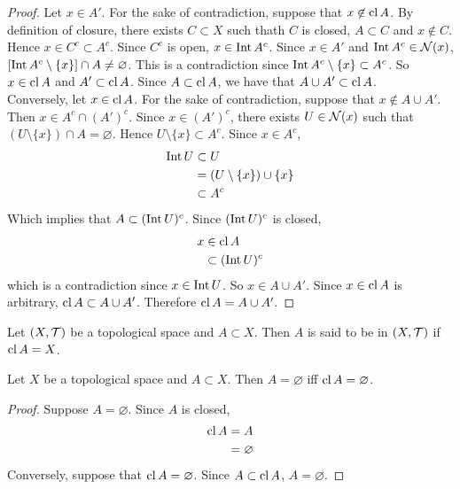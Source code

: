 \documentclass{book}
\begin{document}
	\begin{proof}
	Let $x \in A'$. For the sake of contradiction, suppose that $x \not \in \operatorname{cl} A$. By definition of closure, there exists $C \subset X$ such thath $C$ is closed, $A \subset C$ and $x \not \in C$. Hence $x \in C^c \subset A^c$. Since $C^c$ is open, $x \in \operatorname{Int} A^c$. Since $x \in A'$ and $\operatorname{Int} A^c \in \mathcal{N}(x)$, $[\operatorname{Int} A^c \setminus \{x\}] \cap A \neq \varnothing$. This is a contradiction since $\operatorname{Int} A^c \setminus \{x\} \subset A^c$. So $x \in \operatorname{cl} A$ and $A' \subset \operatorname{cl} A$. Since $A \subset \operatorname{cl} A$, we have that $A \cup A' \subset \operatorname{cl} A $.\\ 
	Conversely, let $x \in \operatorname{cl} A$. For the sake of contradiction, suppose that $x \not \in A \cup A'$. Then $x \in A^c \cap (A')^c$. Since $x \in (A')^c$, there exists $U \in \mathcal{N}(x)$ such that $(U \setminus \{x\}) \cap A = \varnothing$. Hence $U \setminus \{x\} \subset A^c$. Since $x \in A^c$, 
	\begin{align*}
	\operatorname{Int} U 
	& \subset U \\ 
	&= (U \setminus \{x\}) \cup \{x\} \\
	& \subset A^c
\end{align*}	
	Which implies that $A \subset (\operatorname{Int} U)^c$. Since $(\operatorname{Int} U)^c$ is closed, 
	\begin{align*}
		x 
		& \in \operatorname{cl} A \\
		& \subset (\operatorname{Int} U)^c 
	\end{align*}
	which is a contradiction since $x \in \operatorname{Int} U$. So $x \in A \cup A'$. Since $x \in \operatorname{cl} A$ is arbitrary, $\operatorname{cl} A \subset A \cup A'$. Therefore $\operatorname{cl} A = A \cup A'$.
	\end{proof}
	
	\begin{defn}  
		Let $(X, \mathcal{T})$ be a topological space and $A \subset X$. Then $A$ is said to be  in $(X, \mathcal{T})$ if $\operatorname{cl} A = X$. 
	\end{defn}

	\begin{ex}  
		Let $X$ be a topological space and $A \subset X$. Then $A = \varnothing$ iff $\operatorname{cl} A = \varnothing$. 
	\end{ex}

	\begin{proof}
		Suppose $A = \varnothing$. Since $A$ is closed, 
		\begin{align*}
			\operatorname{cl} A 
			& = A \\
			& = \varnothing
		\end{align*}
	Conversely, suppose that $\operatorname{cl} A = \varnothing$. Since $A \subset \operatorname{cl} A$, $A = \varnothing$. 
	\end{proof}
\end{document}

